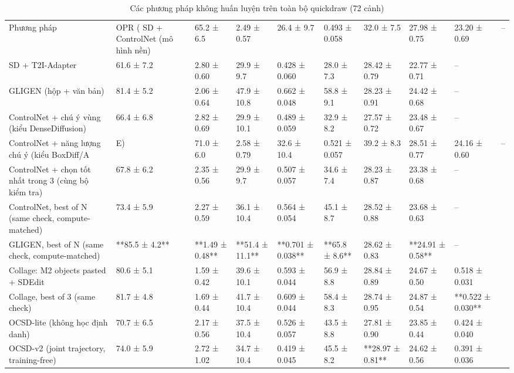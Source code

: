 \begin{table}
\caption{Các phương pháp không huấn luyện trên toàn bộ quickdraw (72 cảnh)}
\begin{tabular}{lllllllll}
\toprule
Phương pháp & OPR (%
\midrule
SD + ControlNet (mô hình nền) & 65.2 ± 6.5 & 2.49 ± 0.57 & 26.4 ± 9.7 & 0.493 ± 0.058 & 32.0 ± 7.5 & 27.98 ± 0.75 & 23.20 ± 0.69 & – \\
SD + T2I-Adapter & 61.6 ± 7.2 & 2.80 ± 0.60 & 29.9 ± 9.7 & 0.428 ± 0.060 & 28.0 ± 7.3 & 28.42 ± 0.79 & 22.77 ± 0.71 & – \\
GLIGEN (hộp + văn bản) & 81.4 ± 5.2 & 2.06 ± 0.64 & 47.9 ± 10.8 & 0.662 ± 0.048 & 58.8 ± 9.1 & 28.23 ± 0.91 & 24.42 ± 0.68 & – \\
ControlNet + chú ý vùng (kiểu DenseDiffusion) & 66.4 ± 6.8 & 2.82 ± 0.69 & 29.9 ± 10.1 & 0.489 ± 0.059 & 32.9 ± 8.2 & 27.57 ± 0.72 & 23.48 ± 0.67 & – \\
ControlNet + năng lượng chú ý (kiểu BoxDiff/A&E) & 71.0 ± 6.0 & 2.58 ± 0.79 & 32.6 ± 10.4 & 0.521 ± 0.057 & 39.2 ± 8.3 & 28.51 ± 0.77 & 24.16 ± 0.60 & – \\
ControlNet + chọn tốt nhất trong 3 (cùng bộ kiểm tra) & 67.8 ± 6.2 & 2.35 ± 0.56 & 29.9 ± 9.7 & 0.507 ± 0.057 & 34.6 ± 7.4 & 28.23 ± 0.87 & 23.38 ± 0.68 & – \\
ControlNet, best of N (same check, compute-matched) & 73.4 ± 5.9 & 2.27 ± 0.59 & 36.1 ± 10.4 & 0.564 ± 0.054 & 45.1 ± 8.7 & 28.52 ± 0.88 & 23.68 ± 0.63 & – \\
GLIGEN, best of N (same check, compute-matched) & **85.5 ± 4.2** & **1.49 ± 0.48** & **51.4 ± 11.1** & **0.701 ± 0.038** & **65.8 ± 8.6** & 28.62 ± 0.83 & **24.91 ± 0.58** & – \\
Collage: M2 objects pasted + SDEdit & 80.6 ± 5.1 & 1.59 ± 0.42 & 39.6 ± 10.1 & 0.593 ± 0.044 & 56.9 ± 8.8 & 28.84 ± 0.89 & 24.67 ± 0.50 & 0.518 ± 0.031 \\
Collage, best of 3 (same check) & 81.7 ± 4.8 & 1.69 ± 0.44 & 41.7 ± 10.4 & 0.609 ± 0.044 & 58.4 ± 8.3 & 28.74 ± 0.95 & 24.87 ± 0.54 & **0.522 ± 0.030** \\
OCSD-lite (không học định danh) & 70.7 ± 6.5 & 2.17 ± 0.56 & 37.5 ± 10.4 & 0.526 ± 0.057 & 43.5 ± 8.8 & 27.81 ± 0.90 & 23.85 ± 0.44 & 0.424 ± 0.040 \\
OCSD-v2 (joint trajectory, training-free) & 74.0 ± 5.9 & 2.72 ± 1.02 & 34.7 ± 10.4 & 0.419 ± 0.045 & 45.5 ± 8.2 & **28.97 ± 0.81** & 24.62 ± 0.56 & 0.391 ± 0.036 \\
\bottomrule
\end{tabular}
\end{table}
